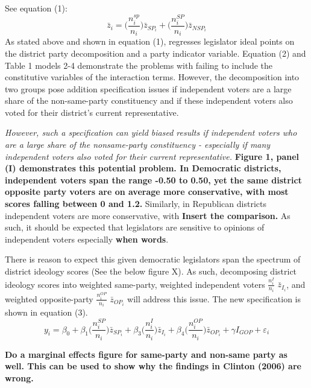 \documentclass[10pt,letterpaper]{article}
\begin{document}
See equation (1):
\begin{equation}
\bar{z}_i = \bigg( \frac{n_i^{sp}}{n_i} \bigg) \bar{z}_{SP_i} + \bigg( \frac{n_i^{SP}}{n_i} \bigg) \bar{z}_{NSP_i}
\end{equation}
As stated above and shown in equation (1), \cite{Clinton2006} regresses legislator ideal points on the district party decomposition and a party indicator variable. Equation (2) and Table 1 models 2-4 demonstrate the problems with failing to include the constitutive variables of the interaction terms. However, the decomposition into two groups pose addition specification issues if independent voters are a large share of the non-same-party constituency and if these independent voters also voted for their district's current representative. 

\textit{However, such a specification can yield biased results if independent voters who are a large share of the nonsame-party constituency - especially if many independent voters also voted for their current representative.} \textbf{Figure 1, panel (I) demonstrates this potential problem. In Democratic districts, independent voters span the range -0.50 to 0.50, yet the same district opposite party voters are on average more conservative, with most scores falling between 0 and 1.2.} Similarly, in Republican districts independent voters are more conservative, with \textbf{Insert the comparison.} As such, it should be expected that legislators are sensitive to opinions of independent voters especially \textbf{when words}.

There is reason to expect this given democratic legislators span the spectrum of district ideology scores (See the below figure X). As such, decomposing district ideology scores into weighted same-party, weighted independent voters $\frac{n_i^{I}}{n_i}$ $\bar{z}_{I_i}$, and weighted opposite-party $\frac{n_i^{OP}}{n_i}$ $\bar{z}_{OP_i}$ will address this issue. The new specification is shown in equation (3).
\begin{equation}
y_i  = \beta_0 + \beta_1 \bigg( \frac{n_i^{SP}}{n_i} \bigg) \bar{z}_{SP_i} + \beta_3 \bigg( \frac{n_i^{I}}{n_i} \bigg) \bar{z}_{I_i} + \beta_4 \bigg( \frac{n_i^{OP}}{n_i} \bigg) \bar{z}_{OP_i} + \gamma I_{GOP} + \varepsilon_i
\end{equation}

\textbf{Do a marginal effects figure for same-party and non-same party as well. This can be used to show why the findings in Clinton (2006) are wrong.}

\newpage
\end{document}
